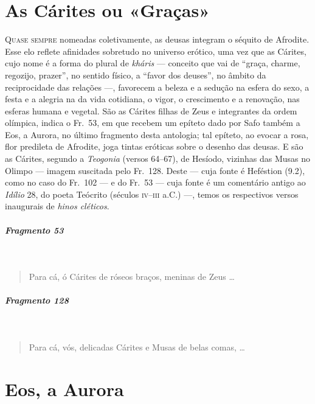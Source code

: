 \chapter{As Cárites ou «Graças»}

\textsc{Quase sempre} nomeadas coletivamente, as deusas integram o séquito de Afrodite.
Esse elo reflete afinidades sobretudo no universo erótico, uma vez que as
Cárites, cujo nome é a forma do plural de \textit{kháris }--- conceito que vai de
“graça, charme, regozijo, prazer”, no sentido físico, a “favor dos deuses”, no
âmbito da reciprocidade das relações ---, favorecem a beleza e a sedução na
esfera do sexo, a festa e a alegria na da vida cotidiana, o vigor, o
crescimento e a renovação, nas esferas humana e vegetal. São as Cárites
filhas de Zeus e integrantes da ordem olímpica, indica o Fr.~53, em que
recebem um epíteto dado por Safo também a Eos, a Aurora, no último fragmento desta antologia;
tal epíteto, ao evocar a rosa, flor predileta de Afrodite, joga tintas eróticas
sobre o desenho das deusas. E são as Cárites, segundo a \textit{Teogonia}
(versos 64--67), de Hesíodo, vizinhas das Musas no Olimpo --- imagem suscitada
pelo Fr.~128. Deste --- cuja fonte é Heféstion (9.2), como no caso do Fr.~102 --- e do		\EP[]
Fr.~53 --- cuja fonte é um comentário antigo ao \textit{Idílio }28, do poeta
Teócrito (séculos \textsc{iv}--\textsc{iii} a.C.) ---, temos os respectivos versos inaugurais de
\textit{hinos cléticos}.


\paragraph{Fragmento 53} \

\begin{verse}
Para cá, ó Cárites de róseos braços, meninas de Zeus \ldots{}
\end{verse}

\paragraph{Fragmento 128} \

\begin{verse}
Para cá, vós, delicadas Cárites e Musas de belas comas, \ldots{}
\end{verse}


\chapter{Eos, a Aurora}

